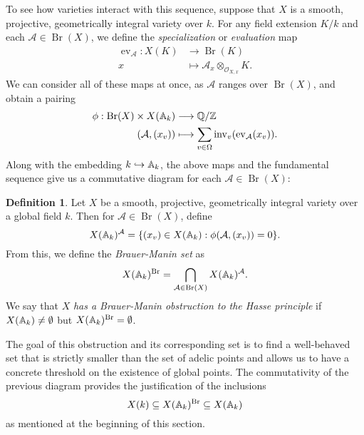 \documentclass[12pt,twoside]{reedthesis}
\theoremstyle{plain}
\theoremstyle{definition}
\newtheorem{definition}{Definition}[section]
\theoremstyle{remark}
\newcommand{\ZZ}{\mathbb{Z}}
\newcommand{\Affine}{\mathbb{A}}
\newcommand{\QQ}{\mathbb{Q}}
\newcommand{\calA}{\mathcal{A}}
\newcommand{\calO}{\mathcal{O}}
\newcommand{\Br}{\operatorname{Br}}
\newcommand{\adele}{\reflectbox{$\Affine$}}
\newcommand{\ev}{\operatorname{ev}}
\newcommand{\inv}{\operatorname{inv}}
\begin{document}
To see how varieties interact with this sequence, suppose that $X$ is a smooth, projective, geometrically integral variety over $k$. For any field extension $K/k$ and each $\calA\in\Br(X)$, we define the \emph{specialization} or \emph{evaluation} map
\begin{align*}
\ev_\calA:X(K)&\longrightarrow\Br(K)\\
x&\longmapsto\calA_x\otimes_{\calO_{X,x}}K.
\end{align*}
We can consider all of these maps at once, as $\calA$ ranges over $\Br(X)$, and obtain a pairing
\begin{align*}
\phi:\Br(X)\times X(\adele_k)&\longrightarrow\QQ/\ZZ\\
(\calA,(x_v))&\longmapsto\sum_{v\in\Omega}\inv_v(\ev_\calA(x_v)).
\end{align*}
Along with the embedding $k\hookrightarrow\adele_k$, the above maps and the fundamental sequence give us a commutative diagram for each $\calA\in\Br(X)$:
\begin{figure}[h]
\centering
{}
\end{figure}
\begin{definition}
Let $X$ be a smooth, projective, geometrically integral variety over a global field $k$. Then for $\calA\in\Br(X)$, define 
\[
X(\adele_k)^\calA=\{(x_v)\in X(\adele_k):\phi(\calA,(x_v))=0\}.
\]
From this, we define the \emph{Brauer-Manin set} as
\[
X(\adele_k)^{\Br}=\bigcap_{\calA\in\Br(X)}X(\adele_k)^\calA.
\]
We say that $X$ \emph{has a Brauer-Manin obstruction to the Hasse principle} if $X(\adele_k)\neq\emptyset$ but $X(\adele_k)^{\Br}=\emptyset$.
\end{definition}
\noindent The goal of this obstruction and its corresponding set is to find a well-behaved set that is strictly smaller than the set of adelic points and allows us to have a concrete threshold on the existence of global points. The commutativity of the previous diagram provides the justification of the inclusions
\[
X(k)\subseteq X(\adele_k)^{\Br}\subseteq X(\adele_k)
\]
as mentioned at the beginning of this section.
\end{document}
